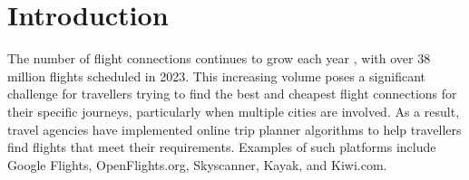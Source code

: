 \section{Introduction}

%

The number of flight connections continues to grow each year \cite{statista_flights_year}, with over 38 million flights scheduled in 2023. This increasing volume poses a significant challenge for travellers trying to find the best and cheapest flight connections for their specific journeys, particularly when multiple cities are involved. As a result, travel agencies have implemented online trip planner algorithms to help travellers find flights that meet their requirements. Examples of such platforms include Google Flights, OpenFlights.org, Skyscanner, Kayak, and Kiwi.com.

